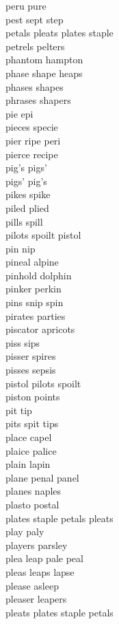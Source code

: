 peru pure\\
pest sept step\\
petals pleats plates staple\\
petrels pelters\\
phantom hampton\\
phase shape heaps\\
phases shapes\\
phrases shapers\\
pie epi\\
pieces specie\\
pier ripe peri\\
pierce recipe\\
pig's pigs'\\
pigs' pig's\\
pikes spike\\
piled plied\\
pills spill\\
pilots spoilt pistol\\
pin nip\\
pineal alpine\\
pinhold dolphin\\
pinker perkin\\
pins snip spin\\
pirates parties\\
piscator apricots\\
piss sips\\
pisser spires\\
pisses sepsis\\
pistol pilots spoilt\\
piston points\\
pit tip\\
pits spit tips\\
place capel\\
plaice palice\\
plain lapin\\
plane penal panel\\
planes naples\\
plasto postal\\
plates staple petals pleats\\
play paly\\
players parsley\\
plea leap pale peal\\
pleas leaps lapse\\
please asleep\\
pleaser leapers\\
pleats plates staple petals\\
